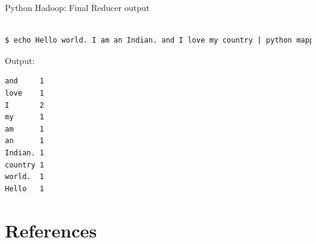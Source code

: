 \documentclass[pdf]{beamer}
\begin{document}
\begin{frame}[fragile]{Python Hadoop: Final Reducer output}
\begin{lstlisting}[language=bash]

$ echo Hello world. I am an Indian. and I love my country | python mapper.py | python reducer.py

\end{lstlisting}
Output:
\begin{lstlisting}[language=bash]
and     1
love    1
I       2
my      1
am      1
an      1
Indian. 1
country 1
world.  1
Hello   1
\end{lstlisting}
\end{frame}


\section{References}
 

\end{document}
